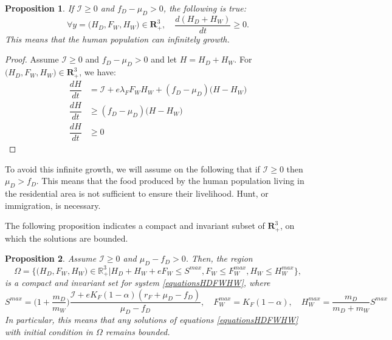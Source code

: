\documentclass{article}
\newcommand{\lfw}{\lambda_{F}}
\newcommand{\lfw}{\lambda_{F}}
\newcommand{\cI}{\mathcal{I}}
\newtheorem{prop}{Proposition}
\begin{document}
\begin{prop}
If $\cI \geq 0$ and $f_D - \mu_D > 0$, the following is true:
$$
\forall	y=\Big(H_D, F_W, H_W\Big) \in \mathbf{R}^3_+, \quad \dfrac{d(H_D + H_W)}{dt} \geq 0.
$$
This means that the human population can infinitely growth.
\end{prop}

\begin{proof}
Assume $\cI \geq 0$ and $f_D - \mu_D > 0$ and let $H = H_D + H_W$. For $\Big(H_D, F_W, H_W\Big) \in \mathbf{R}^3_+$, we have:
\begin{align*}
\dfrac{dH}{dt} &= \cI + e \lfw F_W H_W + (f_D - \mu_D) \Big(H - H_W \Big) \\
\dfrac{dH}{dt} & \geq (f_D - \mu_D) \Big(H - H_W \Big) \\
\dfrac{dH}{dt} & \geq 0
\end{align*}
\end{proof}

To avoid this infinite growth, we will assume on the following that if $\cI \geq 0$ then $\mu_D > f_D$. This means that the food produced by the human population living in the residential area is not sufficient to ensure their livelihood. Hunt, or immigration, is necessary. 

The following proposition indicates a compact and invariant subset of $\mathbf{R}_+^3$, on which the solutions are bounded.

\begin{prop}\label{Invariant region, cI>=0} 
Assume $\cI \geq 0$ and $\mu_D - f_D > 0$. Then, the region
$$\Omega = \Big\{\Big(H_D, F_W, H_W \Big) \in \mathbb{R}_+^3  \Big|H_D + H_W + eF_W \leq S^{max}, F_W \leq F_W^{max}, H_W \leq H_W^{max} \Big\},$$
is a compact and invariant set for system \eqref{equationsHDFWHW}, 
where
$$
S^{max} = \Big(1 + \dfrac{m_D}{m_W} \Big) \dfrac{\cI + e K_F (1-\alpha) (r_F + \mu_D - f_D)}{\mu_D - f_D},
\quad
F_W^{max} = K_F(1-\alpha),
\quad
H_W^{max} = \dfrac{m_D}{m_D + m_W} S^{max}
$$
In particular, this means that any solutions of equations \eqref{equationsHDFWHW} with initial condition in $\Omega$ remains bounded.
\end{prop}
\end{document}
